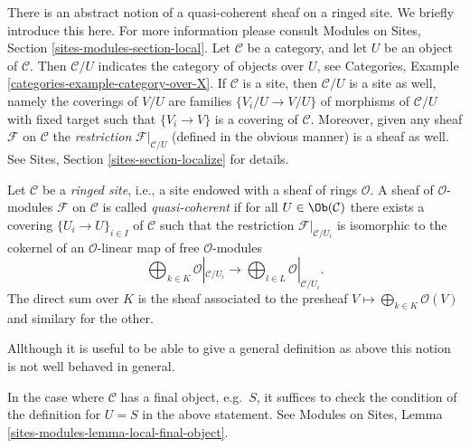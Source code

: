 \noindent
There is an abstract notion of a quasi-coherent sheaf on a ringed site.
We briefly introduce this here. For more information please consult
Modules on Sites, Section \ref{sites-modules-section-local}.
Let $\mathcal{C}$ be a category, and let $U$ be an object of $\mathcal{C}$.
Then $\mathcal{C}/U$ indicates the category of objects over $U$, see
Categories, Example \ref{categories-example-category-over-X}.
If $\mathcal{C}$ is a site, then $\mathcal{C}/U$ is a site as well, namely
the coverings of $V/U$ are families $\{V_i/U \to V/U\}$ of morphisms
of $\mathcal{C}/U$ with fixed target such that
$\{V_i \to V\}$ is a covering of $\mathcal{C}$. Moreover, given any
sheaf $\mathcal{F}$ on $\mathcal{C}$ the {\it restriction}
$\mathcal{F}|_{\mathcal{C}/U}$ (defined in the obvious manner)
is a sheaf as well. See
Sites, Section \ref{sites-section-localize}
for details.

\begin{definition}
\label{definition-ringed-site}
Let $\mathcal{C}$ be a {\it ringed site}, i.e., a site endowed with a
sheaf of rings $\mathcal{O}$. A sheaf of $\mathcal{O}$-modules $\mathcal{F}$ on
$\mathcal{C}$ is called {\it quasi-coherent} if for all
$U \in \Ob(\mathcal{C})$ there exists a covering
$\{U_i \to U\}_{i\in I}$ of $\mathcal{C}$ such that the restriction
$\mathcal{F}|_{\mathcal{C}/U_i}$ is isomorphic to the cokernel of
an $\mathcal{O}$-linear map of free $\mathcal{O}$-modules
$$
\bigoplus\nolimits_{k \in K} \mathcal{O}|_{\mathcal{C}/U_i}
\longrightarrow
\bigoplus\nolimits_{l \in L} \mathcal{O}|_{\mathcal{C}/U_i}.
$$
The direct sum over $K$ is the sheaf associated to the presheaf
$V \mapsto \bigoplus_{k \in K} \mathcal{O}(V)$ and similary for the other.
\end{definition}

\noindent
Allthough it is useful to be able to give a general definition as above
this notion is not well behaved in general.

\begin{remark}
\label{remark-final-object}
In the case where $\mathcal{C}$ has a final object, e.g.\ $S$, it
suffices to check the condition of the definition for
$U = S$ in the above statement. See
Modules on Sites, Lemma \ref{sites-modules-lemma-local-final-object}.
\end{remark}

